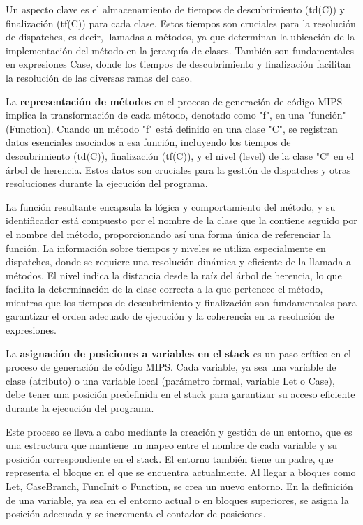 \documentclass[10pt]{article} %
\begin{document}
	Un aspecto clave es el almacenamiento de tiempos de descubrimiento (td(C)) y finalización (tf(C)) para cada clase. Estos tiempos son cruciales para la resolución de dispatches, es decir, llamadas a métodos, ya que determinan la ubicación de la implementación del método en la jerarquía de clases. También son fundamentales en expresiones Case, donde los tiempos de descubrimiento y finalización facilitan la resolución de las diversas ramas del caso. 
	
	La \textbf{representación de métodos} en el proceso de generación de código MIPS implica la transformación de cada método, denotado como "f", en una "función" (Function). Cuando un método "f" está definido en una clase "C", se registran datos esenciales asociados a esa función, incluyendo los tiempos de descubrimiento (td(C)), finalización (tf(C)), y el nivel (level) de la clase "C" en el árbol de herencia. Estos datos son cruciales para la gestión de dispatches y otras resoluciones durante la ejecución del programa.
	
	La función resultante encapsula la lógica y comportamiento del método, y su identificador está compuesto por el nombre de la clase que la contiene seguido por el nombre del método, proporcionando así una forma única de referenciar la función. La información sobre tiempos y niveles se utiliza especialmente en dispatches, donde se requiere una resolución dinámica y eficiente de la llamada a métodos. El nivel indica la distancia desde la raíz del árbol de herencia, lo que facilita la determinación de la clase correcta a la que pertenece el método, mientras que los tiempos de descubrimiento y finalización son fundamentales para garantizar el orden adecuado de ejecución y la coherencia en la resolución de expresiones.
	
	La \textbf{asignación de posiciones a variables en el stack} es un paso crítico en el proceso de generación de código MIPS. Cada variable, ya sea una variable de clase (atributo) o una variable local (parámetro formal, variable Let o Case), debe tener una posición predefinida en el stack para garantizar su acceso eficiente durante la ejecución del programa.
	
	Este proceso se lleva a cabo mediante la creación y gestión de un entorno, que es una estructura que mantiene un mapeo entre el nombre de cada variable y su posición correspondiente en el stack. El entorno también tiene un padre, que representa el bloque en el que se encuentra actualmente. Al llegar a bloques como Let, CaseBranch, FuncInit o Function, se crea un nuevo entorno. En la definición de una variable, ya sea en el entorno actual o en bloques superiores, se asigna la posición adecuada y se incrementa el contador de posiciones.
	
\end{document}
